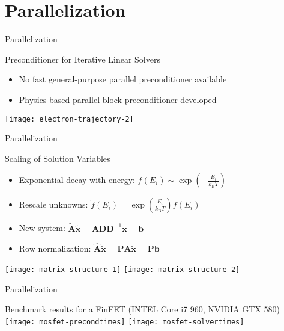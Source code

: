 
\section{Parallelization}


\begin{frame}{Parallelization}
 \begin{block}{Preconditioner for Iterative Linear Solvers}
  \begin{itemize}
   \item No fast general-purpose parallel preconditioner available
   \item Physics-based parallel block preconditioner developed
  \end{itemize}
  \begin{center}
   \texttt{[image: electron-trajectory-2]}
  \end{center}
 \end{block}

\end{frame}



\begin{frame}{Parallelization}
 \begin{block}{Scaling of Solution Variables}
  \begin{itemize}
   \item Exponential decay with energy: $f(E_i) \sim \exp(- \frac{E_i}{k_\mathrm{B} T})$
   \item Rescale unknowns: $\tilde{f}(E_i) = \exp( \frac{E_i}{k_\mathrm{B} T}) f(E_i)$
   \item New system: $\tilde{\mathbf A} \tilde{\mathbf x} = \mathbf A \mathbf D \mathbf D^{-1} \mathbf x = \mathbf b$
   \item Row normalization: $\hat{\mathbf A} \tilde{\mathbf x} = \mathbf P \tilde{\mathbf A} \tilde{\mathbf x} = \mathbf P \mathbf b$
  \end{itemize}
  \begin{center}
   \texttt{[image: matrix-structure-1]} \hfill
   \texttt{[image: matrix-structure-2]}
  \end{center}
 \end{block}

\end{frame}



\begin{frame}{Parallelization}
  \vspace{-1.25cm}
  \begin{center}
   Benchmark results for a FinFET (INTEL Core i7 960, NVIDIA GTX 580) \\
   \vspace*{0.5cm}
  \texttt{[image: mosfet-precondtimes]} \hspace*{0.2cm}
  \texttt{[image: mosfet-solvertimes]}
  \end{center}
\end{frame}

